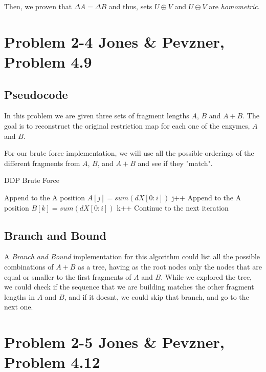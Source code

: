 \documentclass{article}
\begin{document}
Then, we proven that $\Delta A = \Delta B$ and thus, sets $U\oplus V$ and $U \ominus V$ are \textit{homometric}.

\section*{Problem 2-4 Jones \& Pevzner, Problem 4.9}

\subsection*{Pseudocode}

In this problem we are given three sets of fragment lengths $A$, $B$ and $A+B$. The goal is to reconstruct the original restriction map for each one of the enzymes, $A$ and $B$.

For our brute force implementation, we will use all the possible orderings of the different fragments from $A$, $B$, and $A+B$ and see if they "match".

\begin{algorithm}[H]
\caption{DDP Brute Force}
\begin{algorithmic}[1]
     \State Append to the A position $A[j] = sum(dX[0:i])$
     \State j++
     \State Append to the A position $B[k] = sum(dX[0:i])$
     \State k++
     \State Continue to the next iteration
    \EndIf
   \EndFor
  \EndFor
 \EndFor
\EndFor
\end{algorithmic}
\end{algorithm}

\subsection*{Branch and Bound}

A \textit{Branch and Bound} implementation for this algorithm could list all the possible combinations of $A+B$ as a tree, having as the root nodes only the nodes that are equal or smaller to the first fragments of $A$ and $B$. While we explored the tree, we could check if the sequence that we are building matches the other fragment lengths in $A$ and $B$, and if it doesnt, we could skip that branch, and go to the next one.

\section*{Problem 2-5 Jones \& Pevzner, Problem 4.12}
\end{document}
